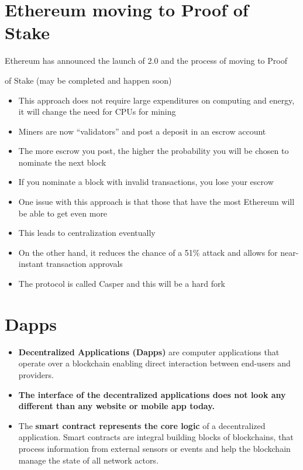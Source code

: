 \section{Ethereum moving to Proof of Stake}

Ethereum has announced the launch of 2.0 and the process of moving to Proof

of Stake (may be completed and happen soon)
\begin{itemize}
	\item This approach does not require large expenditures on computing and energy, it will change the need for CPUs for mining
	\item Miners are now ``validators'' and post a deposit in an escrow account
	\item The more escrow you post, the higher the probability you will be chosen to nominate the next block
	\item If you nominate a block with invalid transactions, you lose your escrow
	\item One issue with this approach is that those that have the most Ethereum will be able to get even more
	\item This leads to centralization eventually
	\item On the other hand, it reduces the chance of a 51\% attack and allows for near-instant transaction approvals
	\item The protocol is called Casper and this will be a hard fork
\end{itemize}

\section{Dapps}

\begin{itemize}
	\item \textbf{Decentralized Applications (Dapps)} are computer applications that operate over a blockchain enabling direct interaction between end-users and providers.
	\item \textbf{The interface of the decentralized applications does not look any different than any website or mobile app today.}
	\item The \textbf{smart contract represents the core logic} of a decentralized application. Smart contracts are integral building blocks of blockchains, that process information from external sensors or events and help the blockchain manage the state of all network actors.
\end{itemize}

